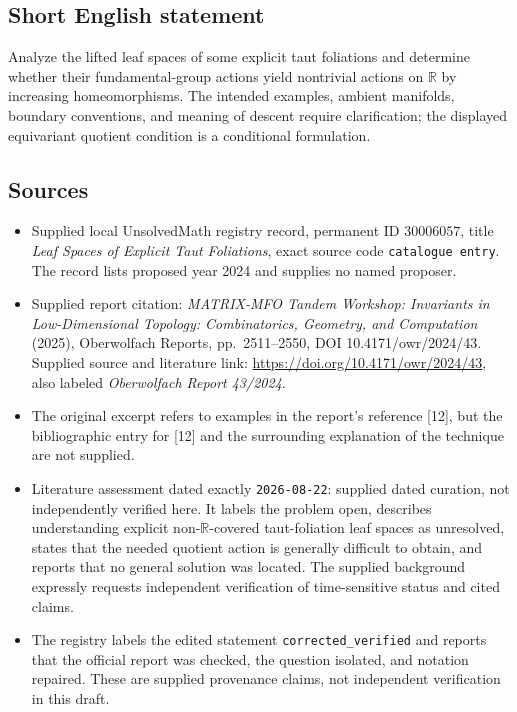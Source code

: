 \documentclass[11pt]{article}
\begin{document}
\subsection{Short English statement}
Analyze the lifted leaf spaces of some explicit taut foliations and determine whether their fundamental-group actions yield nontrivial actions on \(\mathbb R\) by increasing homeomorphisms. The intended examples, ambient manifolds, boundary conventions, and meaning of descent require clarification; the displayed equivariant quotient condition is a conditional formulation.
\subsection{Sources}
\begin{itemize}
\item Supplied local UnsolvedMath registry record, permanent ID \(30006057\), title \emph{Leaf Spaces of Explicit Taut Foliations}, exact source code \texttt{catalogue entry}. The record lists proposed year 2024 and supplies no named proposer.
\item Supplied report citation: \emph{MATRIX-MFO Tandem Workshop: Invariants in Low-Dimensional Topology: Combinatorics, Geometry, and Computation} (2025), Oberwolfach Reports, pp.\ 2511--2550, DOI 10.4171/owr/2024/43. Supplied source and literature link: \url{https://doi.org/10.4171/owr/2024/43}, also labeled \emph{Oberwolfach Report 43/2024}.
\item The original excerpt refers to examples in the report's reference [12], but the bibliographic entry for [12] and the surrounding explanation of the technique are not supplied.
\item Literature assessment dated exactly \texttt{2026-08-22}: supplied dated curation, not independently verified here. It labels the problem open, describes understanding explicit non-\(\mathbb R\)-covered taut-foliation leaf spaces as unresolved, states that the needed quotient action is generally difficult to obtain, and reports that no general solution was located. The supplied background expressly requests independent verification of time-sensitive status and cited claims.
\item The registry labels the edited statement \texttt{corrected\_verified} and reports that the official report was checked, the question isolated, and notation repaired. These are supplied provenance claims, not independent verification in this draft.
\end{itemize}
\end{document}

